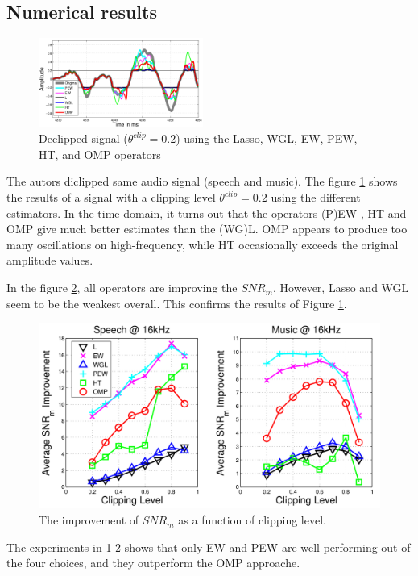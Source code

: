 \documentclass{article}
\numberwithin{dummy}{section}
\begin{document}
\subsection{Numerical results}
\begin{figure}
  \begin{center}
    \includegraphics[width=0.48\textwidth]{figures/courb.png}
  \end{center}
  \caption{Declipped signal ($\theta^{clip} = 0.2$) using the Lasso, WGL, EW, PEW, HT, and OMP operators \cite{gaultier:tel-02148598}}
  \label{fig:Df}
\end{figure}
The autors diclipped same audio signal (speech and music).
The figure \ref{fig:Df} shows the results of a signal with a clipping level $\theta^{clip} = 0.2$ using the different estimators. In the time domain, it turns out that the operators (P)EW , HT and OMP give much better estimates than the (WG)L. OMP appears to produce too many oscillations on high-frequency, while HT occasionally exceeds the original amplitude values.

In the figure \ref{fig:f}, all operators are improving the $SNR_m$. However, Lasso and WGL seem to be the weakest overall. This confirms the results of Figure \ref{fig:Df}.
\begin{figure}[ht!]
    \centering
    \includegraphics[scale=0.3]{figures/sol.png}
    \caption{The improvement
of $SNR_m$ as a function of clipping level. \cite{gaultier:tel-02148598}}
    \label{fig:f}
\end{figure}
The experiments in \ref{fig:Df} \ref{fig:f} shows that only EW and PEW are well-performing out of the four choices, and they outperform the OMP approache.\\
\end{document}
